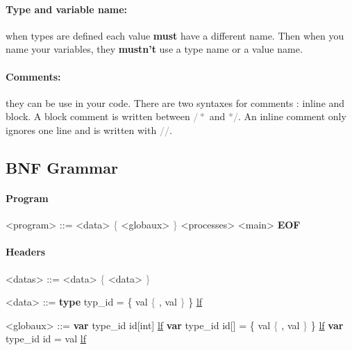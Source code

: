 \documentclass{article}
\begin{document}
\paragraph{Type and variable name:} when types are defined each value \textbf{must} have a different name. Then when you name your variables, they \textbf{mustn't} use a type name or a value name.

\paragraph{Comments:} they can be use in your code. There are two syntaxes for comments : inline and block. A block comment is written between \textcolor{gray}{$/*$} and \textcolor{gray}{$*/$}. An inline comment only ignores one line and is written with \textcolor{gray}{$//$}.


\subsection{BNF Grammar}
\paragraph{Program}
\begin{grammar}
  <program> ::= <data> \textcolor{gray}{\{} <globaux> \textcolor{gray}{\}} <processes>  <main> \textbf{EOF}
\end{grammar}

\paragraph{Headers}
\begin{grammar}
  <datas> ::= <data> \textcolor{gray}{\{} <data> \textcolor{gray}{\}}
  
  <data> ::= \textbf{type} typ\_id = \{ val \textcolor{gray}{\{} , val \textcolor{gray}{\}} \} \underline{lf}
  
  <globaux> ::= \textbf{var} type\_id id[int] \underline{lf}
  \alt\textbf{var} type\_id id[] = \{ val \textcolor{gray}{\{} , val \textcolor{gray}{\}} \} \underline{lf}
  \alt\textbf{var} type\_id id = val \underline{lf}
\end{grammar} 
  
\end{document}
